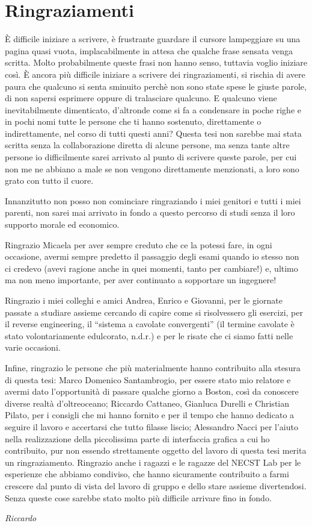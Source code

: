 \chapter*{Ringraziamenti}
È difficile iniziare a scrivere, è frustrante guardare il cursore lampeggiare 
su una pagina quasi vuota, implacabilmente in attesa che qualche frase sensata 
venga scritta. Molto probabilmente queste frasi non hanno senso, tuttavia 
voglio iniziare così. È ancora più difficile iniziare a scrivere dei 
ringraziamenti, si rischia di avere paura che qualcuno si senta sminuito perchè 
non sono state spese le giuste parole, di non sapersi esprimere oppure di 
tralasciare qualcuno. E qualcuno viene inevitabilmente dimenticato, d'altronde 
come si fa a condensare in poche righe e in pochi nomi tutte le persone che ti 
hanno sostenuto, direttamente o indirettamente, nel corso di tutti questi anni? 
Questa tesi non sarebbe mai stata scritta senza la collaborazione diretta di alcune 
persone, ma senza tante altre persone io difficilmente sarei arrivato al punto 
di scrivere queste parole, per cui non me ne abbiano a male se non vengono 
direttamente menzionati, a loro sono grato con tutto il cuore.

Innanzitutto non posso non cominciare ringraziando i miei genitori e tutti i 
miei parenti, non sarei mai arrivato in fondo a questo percorso di studi senza 
il loro supporto morale ed economico.

Ringrazio Micaela per aver sempre creduto che ce la potessi fare, in ogni 
occasione, avermi sempre predetto il passaggio degli esami quando io stesso 
non ci credevo (avevi ragione anche in quei momenti, tanto per cambiare!) e, 
ultimo ma non meno importante, per aver continuato a sopportare un ingegnere!

Ringrazio i miei colleghi e amici Andrea, Enrico e Giovanni, per le giornate 
passate a studiare assieme cercando di capire come si risolvessero gli 
esercizi, per il reverse engineering, il ``sistema a cavolate convergenti'' (il 
termine cavolate è stato volontariamente edulcorato, n.d.r.) e per le risate 
che ci siamo fatti nelle varie occasioni.

Infine, ringrazio le persone che più materialmente hanno contribuito alla 
stesura di questa tesi: Marco Domenico Santambrogio, per essere stato mio 
relatore e avermi dato l'opportunità di passare qualche giorno a Boston, così 
da conoscere diverse realtà d'oltreoceano; Riccardo Cattaneo, Gianluca 
Durelli e Christian Pilato, per i consigli che mi hanno fornito e per il 
tempo che hanno dedicato a seguire il lavoro e accertarsi che tutto filasse 
liscio; Alessandro Nacci per l'aiuto nella realizzazione della piccolissima 
parte di interfaccia grafica a cui ho contribuito, pur non essendo 
strettamente oggetto del lavoro di questa tesi merita un ringraziamento. 
Ringrazio anche i ragazzi e le ragazze del NECST Lab per le esperienze che 
abbiamo condiviso, che hanno sicuramente contribuito a farmi crescere dal punto 
di vista del lavoro di gruppo e dello stare assieme divertendosi. Senza queste 
cose sarebbe stato molto più difficile arrivare fino in fondo.

\vspace{1.5em}
\begin{flushright}
 \textit{Riccardo}
\end{flushright}
